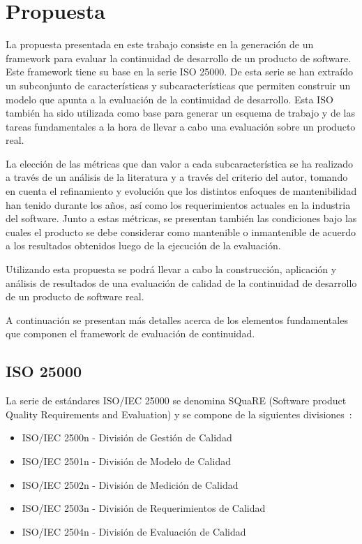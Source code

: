 \chapter{Propuesta}
\label{chap:propuesta}
La propuesta presentada en este trabajo consiste en la generación de un framework
para evaluar la continuidad de desarrollo de un producto de software. Este
framework tiene su base en la serie ISO 25000. De esta serie se han extraído un 
subconjunto de características y subcaracterísticas
que permiten construir un modelo que apunta a la evaluación de la continuidad de desarrollo.
Esta ISO también ha sido utilizada como base para generar un esquema de trabajo y de
las tareas fundamentales a la hora de llevar a cabo una evaluación sobre un producto real.

La elección de las métricas que dan valor a cada subcaracterística se ha realizado a través
de un análisis de la literatura y a través del criterio del autor,
tomando en cuenta el refinamiento y evolución que los distintos enfoques 
de mantenibilidad han tenido durante los años, así como los requerimientos actuales
en la industria del software. Junto a estas métricas, se presentan también las condiciones
bajo las cuales el producto se debe considerar como mantenible o inmantenible de acuerdo
a los resultados obtenidos luego de la ejecución de la evaluación.

Utilizando esta propuesta se podrá llevar a cabo la construcción, aplicación y análisis
de resultados de una evaluación de calidad de la continuidad de desarrollo de un producto
de software real.

A continuación se presentan más detalles acerca de los elementos fundamentales que componen
el framework de evaluación de continuidad.


\section{ISO 25000}

La serie de estándares ISO/IEC 25000 se denomina SQuaRE (Software product
Quality Requirements and Evaluation) y se compone de la siguientes divisiones~\cite{25000}:

\begin{itemize}
    \item ISO/IEC 2500n - División de Gestión de Calidad
    \item ISO/IEC 2501n - División de Modelo de Calidad
    \item ISO/IEC 2502n - División de Medición de Calidad
    \item ISO/IEC 2503n - División de Requerimientos de Calidad
    \item ISO/IEC 2504n - División de Evaluación de Calidad
\end{itemize}

